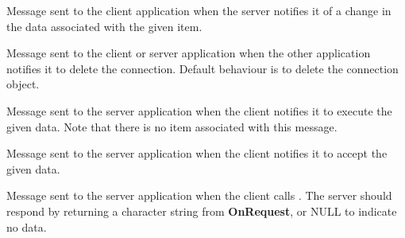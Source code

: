 \label{wxtcpconnectiononadvise}


Message sent to the client application when the server notifies it of a
change in the data associated with the given item.

\label{wxtcpconnectionondisconnect}


Message sent to the client or server application when the other
application notifies it to delete the connection. Default behaviour is
to delete the connection object.

\label{wxtcpconnectiononexecute}


Message sent to the server application when the client notifies it to
execute the given data. Note that there is no item associated with
this message.

\label{wxtcpconnectiononpoke}


Message sent to the server application when the client notifies it to
accept the given data.

\label{wxtcpconnectiononrequest}


Message sent to the server application when the client
calls . The server
should respond by returning a character string from {\bf OnRequest},
or NULL to indicate no data.

\label{wxtcpconnectiononstartadvise}


